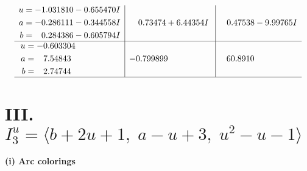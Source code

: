 \documentclass[1p]{elsarticle_modified}
\theoremstyle{definition}
\begin{document}
$$\begin{array}{c|c|c}
\begin{aligned}
u &= -1.031810 - 0.655470 I \\
a &= -0.286111 - 0.344558 I \\
b &= \phantom{-}0.284386 - 0.605794 I\end{aligned}
 & \phantom{-}0.73474 + 6.44354 I & \phantom{-}0.47538 - 9.99765 I \\ \hline\begin{aligned}
u &= -0.603304\phantom{ +0.000000I} \\
a &= \phantom{-}7.54843\phantom{ +0.000000I} \\
b &= \phantom{-}2.74744\phantom{ +0.000000I}\end{aligned}
 & -0.799899\phantom{ +0.000000I} & \phantom{-}60.8910\phantom{ +0.000000I}\\
 \hline 
 \end{array}$$\newpage\newpage\renewcommand{\arraystretch}{1}
\centering \section*{III. $I^u_{3}= \langle b+2 u+1,\;a- u+3,\;u^2- u-1 \rangle$}
\flushleft \textbf{(i) Arc colorings}\\
\end{document}
